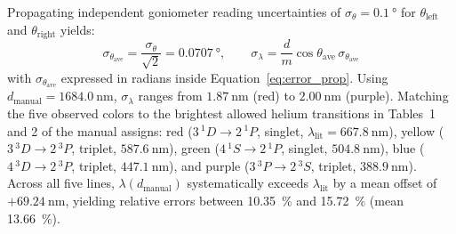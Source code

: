 \documentclass[journal]{IEEEtran}
\begin{document}
Propagating independent goniometer reading uncertainties of $\sigma_\theta = \SI{0.1}{\degree}$ for $\theta_{\text{left}}$ and $\theta_{\text{right}}$ yields:
\begin{equation}
    \sigma_{\theta_{\text{ave}}} = \frac{\sigma_\theta}{\sqrt{2}} = \SI{0.0707}{\degree}, \qquad \sigma_\lambda = \frac{d}{m} \cos\theta_{\text{ave}}\,\sigma_{\theta_{\text{ave}}}
    \label{eq:error_prop}
\end{equation}
with $\sigma_{\theta_{\text{ave}}}$ expressed in radians inside Equation~\eqref{eq:error_prop}. Using $d_{\text{manual}} = \SI{1684.0}{\nano\meter}$, $\sigma_\lambda$ ranges from $\SI{1.87}{\nano\meter}$ (red) to $\SI{2.00}{\nano\meter}$ (purple). Matching the five observed colors to the brightest allowed helium transitions in Tables~1 and 2 of the manual \cite{lab_manual} assigns: red ($3\,^{1}D \rightarrow 2\,^{1}P$, singlet, $\lambda_{\text{lit}} = \SI{667.8}{\nano\meter}$), yellow ($3\,^{3}D \rightarrow 2\,^{3}P$, triplet, $\SI{587.6}{\nano\meter}$), green ($4\,^{1}S \rightarrow 2\,^{1}P$, singlet, $\SI{504.8}{\nano\meter}$), blue ($4\,^{3}D \rightarrow 2\,^{3}P$, triplet, $\SI{447.1}{\nano\meter}$), and purple ($3\,^{3}P \rightarrow 2\,^{3}S$, triplet, $\SI{388.9}{\nano\meter}$). Across all five lines, $\lambda(d_{\text{manual}})$ systematically exceeds $\lambda_{\text{lit}}$ by a mean offset of $+\SI{69.24}{\nano\meter}$, yielding relative errors between \SI{10.35}{\percent} and \SI{15.72}{\percent} (mean \SI{13.66}{\percent}).
\end{document}
